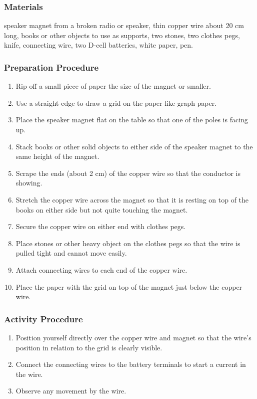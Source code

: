 \subsubsection*{Materials}
speaker magnet from a broken radio or speaker, thin copper wire about 20 cm long, books or other objects to use as supports, two stones, two clothes pegs, knife, connecting wire, two D-cell batteries, white paper, pen.  

\subsubsection*{Preparation Procedure}
\begin{enumerate}
\item{Rip off a small piece of paper the size of the magnet or smaller.} 
\item{Use a straight-edge to draw a grid on the paper like graph paper.} 
\item{Place the speaker magnet flat on the table so that one of the poles is facing up.} 
\item{Stack books or other solid objects to either side of the speaker magnet to the same height of the magnet.} 
\item{Scrape the ends (about 2 cm) of the copper wire so that the conductor is showing.} 
\item{Stretch the copper wire across the magnet so that it is resting on top of the books on either side but not quite touching the magnet.} 
\item{Secure the copper wire on either end with clothes pegs.} 
\item{Place stones or other heavy object on the clothes pegs so that the wire is pulled tight and cannot move easily.} 
\item{Attach connecting wires to each end of the copper wire.} 
\item{Place the paper with the grid on top of the magnet just below the copper wire.} 
\end{enumerate}

\subsubsection*{Activity Procedure}
\begin{enumerate}
\item{Position yourself directly over the copper wire and magnet so that the wire's position in relation to the grid is clearly visible.} 
\item{Connect the connecting wires to the battery terminals to start a current in the wire.} 
\item{Observe any movement by the wire.} 
\end{enumerate}

